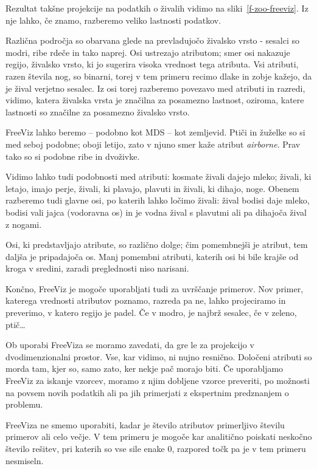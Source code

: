 Rezultat takšne projekcije na podatkih o živalih vidimo na sliki~\ref{f-zoo-freeviz}. Iz nje lahko, če znamo, razberemo veliko lastnosti podatkov.

Različna področja so obarvana glede na prevladujočo živalsko vrsto - sesalci so modri, ribe rdeče in tako naprej. Osi ustrezajo atributom; smer osi nakazuje regijo, živalsko vrsto, ki jo sugerira visoka vrednost tega atributa. Vsi atributi, razen števila nog, so binarni, torej v tem primeru recimo dlake in zobje kažejo, da je žival verjetno sesalec. Iz osi torej razberemo povezavo med atributi in razredi, vidimo, katera živalska vrsta je značilna za posamezno lastnost, oziroma, katere lastnosti so značilne za posamezno živalsko vrsto.

FreeViz lahko beremo -- podobno kot MDS -- kot zemljevid. Ptiči in žuželke so si med seboj podobne; oboji letijo, zato v njuno smer kaže atribut {\em airborne}. Prav tako so si podobne ribe in dvoživke.

Vidimo lahko tudi podobnosti med atributi: kosmate živali dajejo mleko; živali, ki letajo, imajo perje, živali, ki plavajo, plavuti in živali, ki dihajo, noge. Obenem razberemo tudi glavne osi, po katerih lahko ločimo živali: žival bodisi daje mleko, bodisi vali jajca (vodoravna os) in je vodna žival s plavutmi ali pa dihajoča žival z nogami.

Osi, ki predstavljajo atribute, so različno dolge; čim pomembnejši je atribut, tem daljša je pripadajoča os. Manj pomembni atributi, katerih osi bi bile krajše od kroga v sredini, zaradi preglednosti niso narisani.

Končno, FreeViz je mogoče uporabljati tudi za uvrščanje primerov. Nov primer, katerega vrednosti atributov poznamo, razreda pa ne, lahko projeciramo in preverimo, v katero regijo je padel. Če v modro, je najbrž sesalec, če v zeleno, ptič\ldots

Ob uporabi FreeViza se moramo zavedati, da gre le za projekcijo v dvodimenzionalni prostor. Vse, kar vidimo, ni nujno resnično. Določeni atributi so morda tam, kjer so, samo zato, ker nekje pač morajo biti. Če uporabljamo FreeViz za iskanje vzorcev, moramo z njim dobljene vzorce preveriti, po možnosti na povsem novih podatkih ali pa jih primerjati z ekspertnim predznanjem o problemu.

FreeViza ne smemo uporabiti, kadar je število atributov primerljivo številu primerov ali celo večje. V tem primeru je mogoče kar analitično poiskati neskočno število rešitev, pri katerih so vse sile enake 0, razpored točk pa je v tem primeru nesmiseln.

